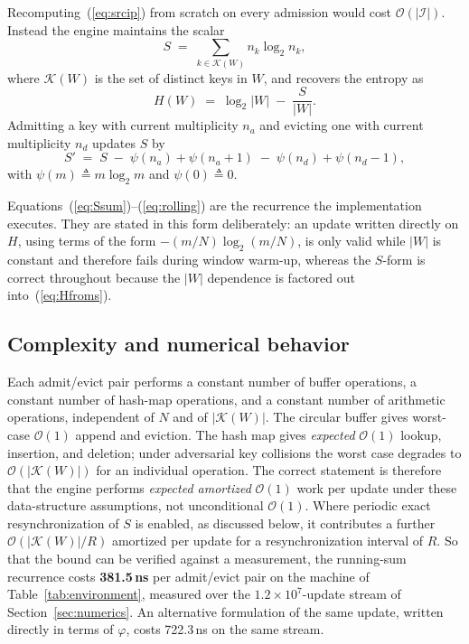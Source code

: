 \documentclass{ieeeaccess}
\begin{document}
Recomputing~(\ref{eq:srcip}) from scratch on every admission would cost $\mathcal{O}(|\mathcal{I}|)$. Instead the engine maintains the scalar
\begin{equation}
S \;=\; \sum_{k \in \mathcal{K}(W)} n_k \log_2 n_k ,
\label{eq:Ssum}
\end{equation}
where $\mathcal{K}(W)$ is the set of distinct keys in $W$, and recovers the entropy as
\begin{equation}
H(W) \;=\; \log_2 |W| \;-\; \frac{S}{|W|} .
\label{eq:Hfroms}
\end{equation}
Admitting a key with current multiplicity $n_a$ and evicting one with current multiplicity $n_d$ updates $S$ by
\begin{equation}
S' \;=\; S \;-\; \psi(n_a) + \psi(n_a{+}1) \;-\; \psi(n_d) + \psi(n_d{-}1),
\label{eq:rolling}
\end{equation}
with $\psi(m) \triangleq m \log_2 m$ and $\psi(0) \triangleq 0$.

Equations~(\ref{eq:Ssum})--(\ref{eq:rolling}) are the recurrence the implementation executes. They are stated in this form deliberately: an update written directly on $H$, using terms of the form $-(m/N)\log_2(m/N)$, is only valid while $|W|$ is constant and therefore fails during window warm-up, whereas the $S$-form is correct throughout because the $|W|$ dependence is factored out into~(\ref{eq:Hfroms}).

\subsection{Complexity and numerical behavior}
\label{sec:complexity}
Each admit/evict pair performs a constant number of buffer operations, a constant number of hash-map operations, and a constant number of arithmetic operations, independent of $N$ and of $|\mathcal{K}(W)|$. The circular buffer gives worst-case $\mathcal{O}(1)$ append and eviction. The hash map gives \emph{expected} $\mathcal{O}(1)$ lookup, insertion, and deletion; under adversarial key collisions the worst case degrades to $\mathcal{O}(|\mathcal{K}(W)|)$ for an individual operation. The correct statement is therefore that the engine performs \emph{expected amortized} $\mathcal{O}(1)$ work per update under these data-structure assumptions, not unconditional $\mathcal{O}(1)$. Where periodic exact resynchronization of $S$ is enabled, as discussed below, it contributes a further $\mathcal{O}(|\mathcal{K}(W)|/R)$ amortized per update for a resynchronization interval of $R$. So that the bound can be verified against a measurement, the running-sum recurrence costs \textbf{381.5\,ns} per admit/evict pair on the machine of Table~\ref{tab:environment}, measured over the $1.2\times10^{7}$-update stream of Section~\ref{sec:numerics}. An alternative formulation of the same update, written directly in terms of $\varphi$, costs 722.3\,ns on the same stream.
\end{document}
